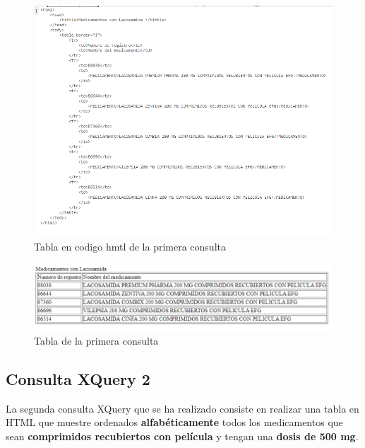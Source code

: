 \documentclass[../main.tex]{subfiles}
\begin{document}
\begin{figure}[h]
    \centering
    \includegraphics[scale=0.8]{images/xquery_1_output.PNG}
    \caption{Tabla en codigo hmtl de la primera consulta}
    \label{fig:mesh1}
\end{figure}
\newpage
\begin{figure}[h]
    \centering
    \includegraphics[scale=0.8]{images/xquery_1_html.PNG}
    \caption{Tabla de la primera consulta}
    \label{fig:mesh1}
\end{figure}

\newpage

\subsection{Consulta XQuery 2}
La segunda consulta XQuery que se ha realizado consiste en realizar una tabla en HTML que muestre ordenados \textbf{alfabéticamente} todos los medicamentos que sean \textbf{comprimidos recubiertos con película} y tengan una \textbf{dosis de 500 mg}.
\end{document}
